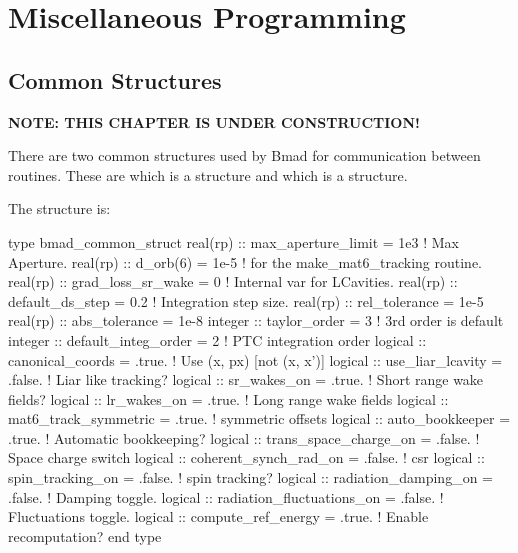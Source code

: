 \chapter{Miscellaneous Programming}

\section{Common Structures}
\label{s:common.struct}


{\bf NOTE: THIS CHAPTER IS UNDER CONSTRUCTION!}

There are two common structures used by Bmad for communication between
routines. These are  which is a 
structure and  which is a 
structure.

The  structure is:
\begin{example}
  type bmad_common_struct
    real(rp) :: max_aperture_limit = 1e3       ! Max Aperture.
    real(rp) :: d_orb(6)           = 1e-5      ! for the make_mat6_tracking routine.
    real(rp) :: grad_loss_sr_wake  = 0         ! Internal var for LCavities.
    real(rp) :: default_ds_step    = 0.2       ! Integration step size.  
    real(rp) :: rel_tolerance = 1e-5
    real(rp) :: abs_tolerance = 1e-8
    integer :: taylor_order = 3                ! 3rd order is default
    integer :: default_integ_order = 2         ! PTC integration order
    logical :: canonical_coords = .true.       ! Use (x, px) [not (x, x')]
    logical :: use_liar_lcavity = .false.      ! Liar like tracking?
    logical :: sr_wakes_on = .true.            ! Short range wake fields?
    logical :: lr_wakes_on = .true.            ! Long range wake fields
    logical :: mat6_track_symmetric = .true.   ! symmetric offsets
    logical :: auto_bookkeeper = .true.        ! Automatic bookkeeping?
    logical :: trans_space_charge_on = .false. ! Space charge switch
    logical :: coherent_synch_rad_on = .false. ! csr 
    logical :: spin_tracking_on = .false.      ! spin tracking?
    logical :: radiation_damping_on = .false.       ! Damping toggle.
    logical :: radiation_fluctuations_on = .false.  ! Fluctuations toggle.
    logical :: compute_ref_energy = .true.          ! Enable recomputation?
  end type
\end{example}


